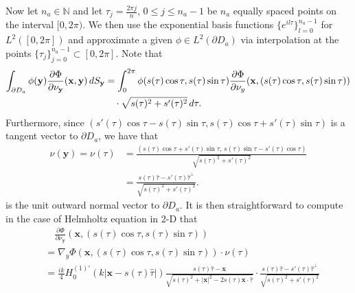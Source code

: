 \documentclass[11pt]{amsart}
\theoremstyle{definition}
\theoremstyle{definition}
\theoremstyle{definition}
\begin{document}
Now let $n_{a} \in \mathbb{N}$ and let $\tau_{j} = \frac{2\pi j}{n}$, $0 \leq j \leq n_{a}-1$ be $n_{a}$ equally spaced points on the interval $[0,2\pi)$. We then use the exponential basis functions $\{e^{il\tau}\}_{l=0}^{n_{a}-1}$ for $L^{2}([0,2\pi])$ and approximate a given $\phi \in L^{2}(\partial D_{a})$ via interpolation at the points $\{\tau_{j}\}_{j=0}^{n_{a}-1} \subset [0,2\pi]$. Note that
\begin{align}
\int_{\partial D_{a}}\phi(\mathbf{y}) \frac{\partial \Phi}{\partial \nu_{\mathbf{y}}}(\mathbf{x},\mathbf{y})\,dS_{\mathbf{y}} & = \int_{0}^{2\pi}\phi(s(\tau)\cos{\tau},s(\tau)\sin{\tau})\frac{\partial \Phi}{\partial \nu_{y}}(\mathbf{x}, (s(\tau)\cos{\tau},s(\tau)\sin{\tau})) \notag\\
& \quad \cdot \sqrt{s(\tau)^{2} + s'(\tau)^{2}}\,d\tau.
\end{align}
Furthermore, since $\left( s'(\tau)\cos{\tau} - s(\tau)\sin{\tau}, s(\tau)\cos{\tau} + s'(\tau)\sin{\tau}\right)$ is a tangent vector to $\partial D_{a}$, we have that
\begin{align*}
\nu(\mathbf{y}) = \nu(\tau) & = \frac{(s(\tau)\cos{\tau} + s'(\tau)\sin{\tau}, \, s(\tau)\sin{\tau} - s'(\tau)\cos{\tau})}{\sqrt{ s(\tau)^{2} + s'(\tau)^{2}}}\\
& = \frac{s(\tau)\widehat{\tau} - s'(\tau)\widehat{\tau}^{\perp}}{\sqrt{ s(\tau)^{2} + s'(\tau)^{2}}}.
\end{align*}
is the unit outward normal vector to $\partial D_{a}$. It is then straightforward to compute in the case of Helmholtz equation in 2-D that
\begin{align*}
& \quad \frac{\partial \Phi}{\partial \nu_{\mathbf{y}}}(\mathbf{x}, (s(\tau)\cos{\tau},s(\tau)\sin{\tau}))\\
& = \nabla_{y}\Phi(\mathbf{x}, (s(\tau)\cos{\tau}, s(\tau)\sin{\tau})) \cdot \nu(\tau)\\
& = \frac{ik}{4}H_{0}^{(1)'}(k|\mathbf{x} - s(\tau)\widehat{\tau}|)\frac{s(\tau)\widehat{\tau} - \mathbf{x}}{\sqrt{s(\tau)^{2} + |\mathbf{x}|^{2} - 2s(\tau)\mathbf{x}\cdot \widehat{\tau}}} \cdot \frac{s(\tau)\widehat{\tau} - s'(\tau)\widehat{\tau}^{\perp}}{\sqrt{s(\tau)^{2} + s'(\tau)^{2}}}
\end{align*}
\end{document}
